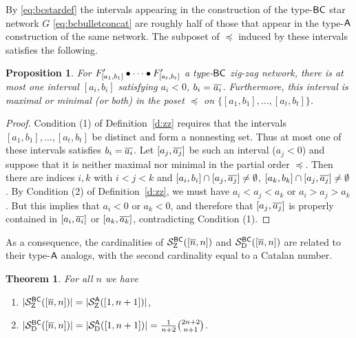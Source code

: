 \documentclass[11pt]{article}
\newtheorem{thm}[theo]{Theorem}
\newtheorem{prop}[theo]{Proposition}
\theoremstyle{definition}
\numberwithin{equation}{section}
\begin{document}
By \eqref{eq:bcstardef} the intervals appearing in the construction
of the type-$\mathsf{BC}$ star network $G$ \eqref{eq:bcbulletconcat}
are roughly half of those that appear in the type-$\mathsf{A}$ construction
of the same network.  The subposet of $\preceq$ induced by these intervals
satisfies the following.
\begin{prop}\label{p:atmostonesymminterval}
  For $F'_{\smash{[a_1,b_1]}} \bullet \cdots \bullet F'_{\smash{[a_t,b_t]}}$ 
  a type-$\mathsf{BC}$ zig-zag network,
  there is at most one interval $[a_i, b_i]$
  satisfying $a_i < 0$, $b_i = \overline{a_i}$.
  Furthermore, this interval is maximal or minimal
  (or both) in the poset $\preceq$ on $\{ [a_1,b_1], \dotsc, [a_t,b_t] \}$.
\end{prop}
\begin{proof}
  Condition (1) of Definition~\ref{d:zz} requires that the intervals
  $[a_1,b_1], \dotsc, [a_t,b_t]$ be distinct and form a nonnesting set.
  Thus at most one of these intervals satisfies $b_i = \overline{a_i}$.
  Let $[a_j,\overline{a_j}]$ be such an interval ($a_j < 0$) and suppose that
  it is neither maximal nor minimal in the partial order $\preceq$.
  Then there are indices $i, k$ with $i < j < k$ and
  $[a_i,b_i] \cap [a_j,\overline{a_j}] \neq \emptyset$,
  $[a_k,b_k] \cap [a_j,\overline{a_j}] \neq \emptyset$.  By Condition (2)
  of Definition~\ref{d:zz}, we must have $a_i < a_j < a_k$
  or $a_i > a_j > a_k$.  But this implies that $a_i < 0$ or $a_k < 0$, and
  therefore that $[a_j, \overline{a_j}]$ is properly contained in $[a_i, \overline{a_i}]$
  or $[a_k,\overline{a_k}]$, contradicting Condition (1).
  \end{proof}
As a consequence, the cardinalities of $\mathcal S^{\mathsf{BC}}_{\mathrm Z}([\overline{n},n])$ and
$\mathcal S^{\mathsf{BC}}_{\mathrm D}([\overline{n},n])$ are related to their type-$\mathsf{A}$ analogs,
with the second cardinality equal to a Catalan number.
\begin{thm}\label{t:catalan}
  For all $n$ we have
  \begin{enumerate}
  \item $|\mathcal S^{\mathsf{BC}}_{\mathrm Z}([\overline{n},n])| = |\mathcal S^{\mathsf{A}}_{\mathrm Z}([1,n+1])|$,
  \item $|\mathcal S^{\mathsf{BC}}_{\mathrm D}([\overline{n},n])| = |\mathcal S^{\mathsf{A}}_{\mathrm D}([1,n+1])| = \frac1{n+2} \tbinom{2n+2}{n+1}$.
    \end{enumerate}
\end{thm}
\end{document}
